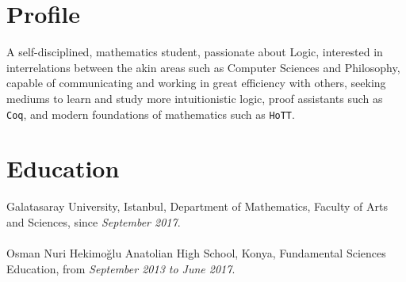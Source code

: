 \documentclass[11pt, a4paper, twocolumn]{memoir}
\begin{document}
\section*{Profile}
A self-disciplined, mathematics student, passionate about Logic,
interested in interrelations between the akin areas such as Computer
Sciences and Philosophy, capable of communicating and working in great
efficiency with others, seeking mediums to learn and study more
intuitionistic logic, proof assistants such as \texttt{Coq}, and modern
foundations of mathematics such as \texttt{HoTT}.
\section*{Education}
Galatasaray University, Istanbul, Department of Mathematics,
Faculty of Arts and Sciences, since \textit{September 2017}.\\ \\
Osman Nuri Hekimoğlu Anatolian High School, \linebreak
Konya, Fundamental Sciences Education, from \textit{September
  2013 to June 2017}.
\end{document}
